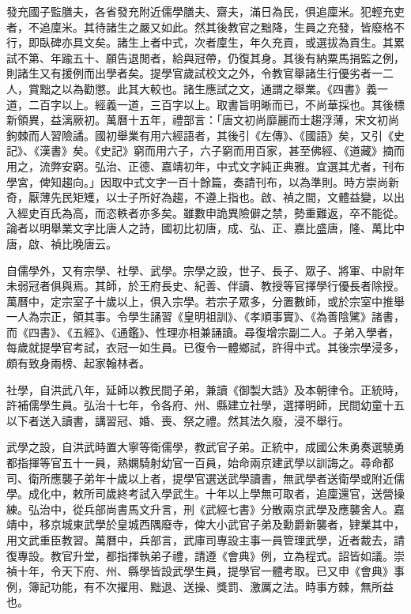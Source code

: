 發充國子監膳夫，各省發充附近儒學膳夫、齋夫，滿日為民，俱追廩米。犯輕充吏者，不追廩米。其待諸生之嚴又如此。然其後教官之黜降，生員之充發，皆廢格不行，即臥碑亦具文矣。諸生上者中式，次者廩生，年久充貢，或選拔為貢生。其累試不第、年踰五十、願告退閒者，給與冠帶，仍復其身。其後有納粟馬捐監之例，則諸生又有援例而出學者矣。提學官歲試校文之外，令教官舉諸生行優劣者一二人，賞黜之以為勸懲。此其大較也。諸生應試之文，通謂之舉業。《四書》義一道，二百字以上。經義一道，三百字以上。取書旨明晰而已，不尚華採也。其後標新領異，益漓厥初。萬曆十五年，禮部言：「唐文初尚靡麗而士趨浮薄，宋文初尚鉤棘而人習險譎。國初舉業有用六經語者，其後引《左傳》、《國語》矣，又引《史記》、《漢書》矣。《史記》窮而用六子，六子窮而用百家，甚至佛經、《道藏》摘而用之，流弊安窮。弘治、正德、嘉靖初年，中式文字純正典雅。宜選其尤者，刊布學宮，俾知趨向。」因取中式文字一百十餘篇，奏請刊布，以為準則。時方崇尚新奇，厭薄先民矩矱，以士子所好為趨，不遵上指也。啟、禎之間，文體益變，以出入經史百氏為高，而恣軼者亦多矣。雖數申詭異險僻之禁，勢重難返，卒不能從。論者以明舉業文字比唐人之詩，國初比初唐，成、弘、正、嘉比盛唐，隆、萬比中唐，啟、禎比晚唐云。

自儒學外，又有宗學、社學、武學。宗學之設，世子、長子、眾子、將軍、中尉年未弱冠者俱與焉。其師，於王府長史、紀善、伴讀、教授等官擇學行優長者除授。萬曆中，定宗室子十歲以上，俱入宗學。若宗子眾多，分置數師，或於宗室中推舉一人為宗正，領其事。令學生誦習《皇明祖訓》、《孝順事實》、《為善陰騭》諸書，而《四書》、《五經》、《通鑑》、性理亦相兼誦讀。尋復增宗副二人。子弟入學者，每歲就提學官考試，衣冠一如生員。已復令一體鄉試，許得中式。其後宗學浸多，頗有致身兩榜、起家翰林者。

社學，自洪武八年，延師以教民間子弟，兼讀《御製大誥》及本朝律令。正統時，許補儒學生員。弘治十七年，令各府、州、縣建立社學，選擇明師，民間幼童十五以下者送入讀書，講習冠、婚、喪、祭之禮。然其法久廢，浸不舉行。

武學之設，自洪武時置大寧等衛儒學，教武官子弟。正統中，成國公朱勇奏選驍勇都指揮等官五十一員，熟嫻騎射幼官一百員，始命兩京建武學以訓誨之。尋命都司、衛所應襲子弟年十歲以上者，提學官選送武學讀書，無武學者送衛學或附近儒學。成化中，敕所司歲終考試入學武生。十年以上學無可取者，追廩還官，送營操練。弘治中，從兵部尚書馬文升言，刑《武經七書》分散兩京武學及應襲舍人。嘉靖中，移京城東武學於皇城西隅廢寺，俾大小武官子弟及勳爵新襲者，肄業其中，用文武重臣教習。萬曆中，兵部言，武庫司專設主事一員管理武學，近者裁去，請復專設。教官升堂，都指揮執弟子禮，請遵《會典》例，立為程式。詔皆如議。崇禎十年，令天下府、州、縣學皆設武學生員，提學官一體考取。已又申《會典》事例，簿記功能，有不次擢用、黜退、送操、獎罰、激厲之法。時事方棘，無所益也。

